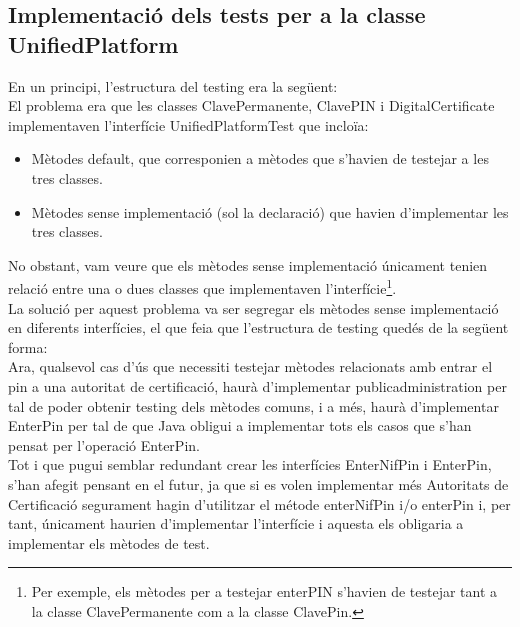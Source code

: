 \documentclass[12pt, letterpaper]{article}
\begin{document}
\newpage
\subsection{Implementació dels tests per a la classe UnifiedPlatform}
\label{interfaces}
En un principi, l'estructura del testing era la següent:\\
\vspace{0.5cm}
El problema era que les classes ClavePermanente, ClavePIN i DigitalCertificate implementaven l'interfície UnifiedPlatformTest que incloïa:
\begin{itemize}
  \item Mètodes default, que corresponien a mètodes que s'havien de testejar a les tres classes.
  \item Mètodes sense implementació (sol la declaració) que havien d'implementar les tres classes.
\end{itemize}

No obstant, vam veure que els mètodes sense implementació únicament tenien relació entre una o dues classes que implementaven l'interfície\footnote{Per exemple, els mètodes per a testejar enterPIN s'havien de testejar tant a la classe ClavePermanente com a la classe ClavePin.}. \\
La solució per aquest problema va ser segregar els mètodes sense implementació en diferents interfícies, el que feia que l'estructura de testing quedés de la següent forma:\\

\vspace{0.5cm}
Ara, qualsevol cas d'ús que necessiti testejar mètodes relacionats amb entrar el pin a una autoritat de certificació, haurà d'implementar publicadministration per tal de poder obtenir testing dels mètodes comuns, i a més, haurà d'implementar EnterPin per tal de que Java obligui a implementar tots els casos que s'han pensat per l'operació EnterPin.\\

Tot i que pugui semblar redundant crear les interfícies EnterNifPin i EnterPin, s'han afegit pensant en el futur, ja que si es volen implementar més Autoritats de Certificació segurament hagin d'utilitzar el métode enterNifPin i/o enterPin i, per tant, únicament haurien d'implementar l'interfície i aquesta els obligaria a implementar els mètodes de test.
\end{document}
